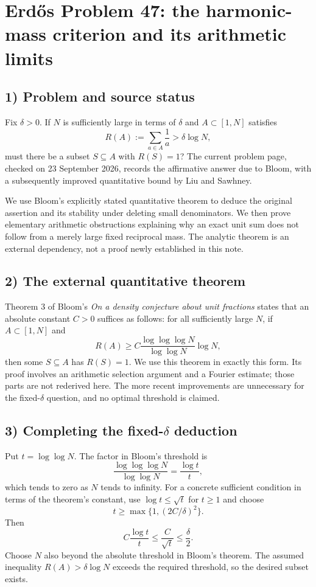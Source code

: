 \section{Erd\H{o}s Problem 47: the harmonic-mass criterion and its arithmetic limits}

\subsection{1) Problem and source status}
Fix $\delta>0$. If $N$ is sufficiently large in terms of $\delta$ and
$A\subset[1,N]$ satisfies
\[
 R(A):=\sum_{a\in A}\frac1a>\delta\log N,
\]
must there be a subset $S\subseteq A$ with $R(S)=1$?
The current problem page, checked on 23 September 2026, records the
affirmative answer due to Bloom, with a subsequently improved
quantitative bound by Liu and Sawhney.

We use Bloom's explicitly stated quantitative theorem to deduce the
original assertion and its stability under deleting small denominators.
We then prove elementary arithmetic obstructions explaining why an
exact unit sum does not follow from a merely large fixed reciprocal
mass. The analytic theorem is an external dependency, not a proof
newly established in this note.

\subsection{2) The external quantitative theorem}
Theorem 3 of Bloom's \emph{On a density conjecture about unit fractions}
states that an absolute constant $C>0$ suffices as follows: for all
sufficiently large $N$, if $A\subset[1,N]$ and
\[
 R(A)\geq C\frac{\log\log\log N}{\log\log N}\log N,
\]
then some $S\subseteq A$ has $R(S)=1$.
We use this theorem in exactly this form. Its proof involves an
arithmetic selection argument and a Fourier estimate; those parts are
not rederived here. The more recent improvements are unnecessary for
the fixed-$\delta$ question, and no optimal threshold is claimed.

\subsection{3) Completing the fixed-$\delta$ deduction}
Put $t=\log\log N$. The factor in Bloom's threshold is
\[
 \frac{\log\log\log N}{\log\log N}=\frac{\log t}{t},
\]
which tends to zero as $N$ tends to infinity. For a concrete sufficient
condition in terms of the theorem's constant, use
$\log t\leq\sqrt t$ for $t\geq1$ and choose
\[
 t\geq\max\{1,(2C/\delta)^2\}.
\]
Then
\[
 C\frac{\log t}{t}\leq\frac{C}{\sqrt t}\leq\frac\delta2.
\]
Choose $N$ also beyond the absolute threshold in Bloom's theorem.
The assumed inequality $R(A)>\delta\log N$ exceeds the required
threshold, so the desired subset exists.

